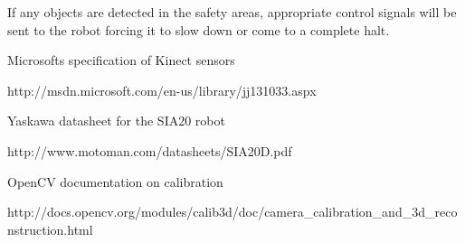 \documentclass[10pt,a4paper,english]{article}
\begin{document}
If any objects are detected in the safety areas, appropriate control signals will be sent to the robot forcing it to slow down or come to a complete halt.

\clearpage

\begin{thebibliography}{9}

Microsofts specification of Kinect sensors

http://msdn.microsoft.com/en-us/library/jj131033.aspx

Yaskawa datasheet for the SIA20 robot

http://www.motoman.com/datasheets/SIA20D.pdf

OpenCV documentation on calibration

http://docs.opencv.org/modules/calib3d/doc/camera\_calibration\_and\_3d\_reconstruction.html


\end{thebibliography}
\end{document}
